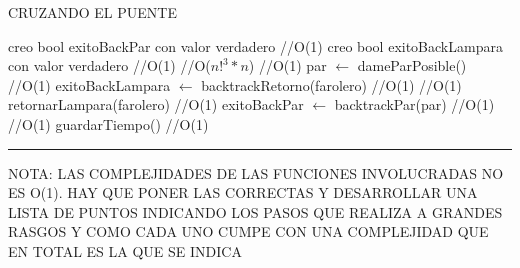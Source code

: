 \begin{algorithm}[H]
\caption{CRUZANDO EL PUENTE}
\begin{algorithmic}[1]
\state creo bool exitoBackPar con valor verdadero \hfill //O(1)
\state creo bool exitoBackLampara con valor verdadero \hfill //O(1)
 \hfill //O($n!^{3} \ast n$)
 \hfill //O(1)
\state par $\gets$ dameParPosible() \hfill //O(1)
\Else
\state exitoBackLampara $\gets$ backtrackRetorno(farolero) \hfill //O(1)
\endif
{} \hfill //O(1)
\state retornarLampara(farolero) \hfill //O(1)
\Else
\state exitoBackPar $\gets$ backtrackPar(par) \hfill //O(1)
\endif
{} \hfill //O(1)
\state guardarTiempo() \hfill //O(1)
\endif
\endwhile
\EndFunction 
\end{algorithmic}
\hrule
{}
\end{algorithm}

NOTA: LAS COMPLEJIDADES DE LAS FUNCIONES INVOLUCRADAS NO ES O(1). 
HAY QUE PONER LAS CORRECTAS Y DESARROLLAR UNA LISTA DE PUNTOS INDICANDO LOS PASOS QUE REALIZA A GRANDES RASGOS Y COMO CADA UNO CUMPE CON UNA COMPLEJIDAD QUE EN TOTAL ES LA QUE SE INDICA

